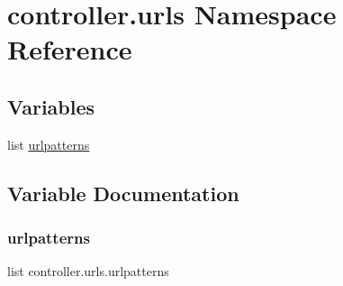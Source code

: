 \hypertarget{namespacecontroller_1_1urls}{}\section{controller.\+urls Namespace Reference}
\label{namespacecontroller_1_1urls}
\subsection*{Variables}
\begin{DoxyCompactItemize}
\item 
list \hyperlink{namespacecontroller_1_1urls_acba3e26d9aeb475059be4fd949a1a2eb}{urlpatterns}
\end{DoxyCompactItemize}


\subsection{Variable Documentation}
\mbox{\label{namespacecontroller_1_1urls_acba3e26d9aeb475059be4fd949a1a2eb}} 
\subsubsection{\texorpdfstring{urlpatterns}{urlpatterns}}
{\footnotesize\ttfamily list controller.\+urls.\+urlpatterns}

